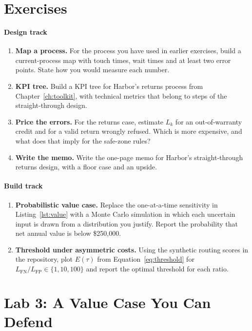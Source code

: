 \section*{Exercises}

\paragraph{Design track}
\begin{enumerate}[itemsep=2pt]
  \item \textbf{Map a process.} For the process you have used in earlier exercises, build a current-process map with touch times, wait times and at least two error points. State how you would measure each number.
  \item \textbf{KPI tree.} Build a KPI tree for Harbor's returns process from Chapter~\ref{ch:toolkit}, with technical metrics that belong to steps of the straight-through design.
  \item \textbf{Price the errors.} For the returns case, estimate $L_k$ for an out-of-warranty credit and for a valid return wrongly refused. Which is more expensive, and what does that imply for the safe-zone rules?
  \item \textbf{Write the memo.} Write the one-page memo for Harbor's straight-through returns design, with a floor case and an upside.
\end{enumerate}

\paragraph{Build track}
\begin{enumerate}[resume, itemsep=2pt]
  \item \textbf{Probabilistic value case.} Replace the one-at-a-time sensitivity in Listing~\ref{lst:value} with a Monte Carlo simulation in which each uncertain input is drawn from a distribution you justify. Report the probability that net annual value is below \$250{,}000.
  \item \textbf{Threshold under asymmetric costs.} Using the synthetic routing scores in the repository, plot $E(\tau)$ from Equation~\eqref{eq:threshold} for $L_{\text{FN}}/L_{\text{FP}} \in \{1, 10, 100\}$ and report the optimal threshold for each ratio.
\end{enumerate}

\section*{Lab 3: A Value Case You Can Defend}


